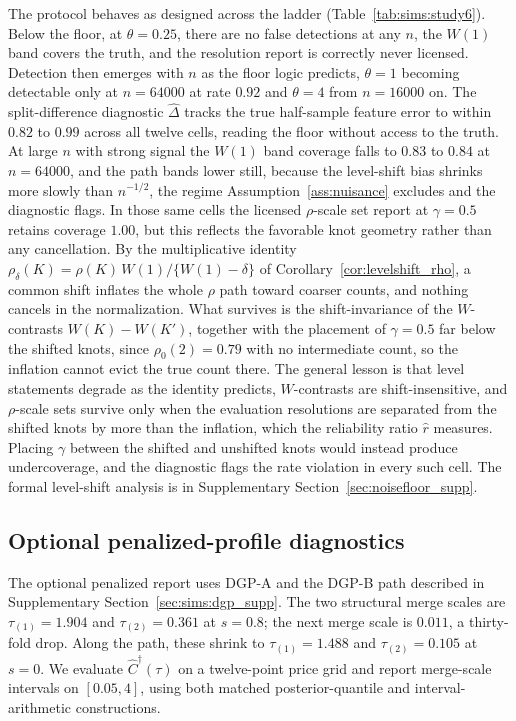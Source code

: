\documentclass[11pt]{article}
\begin{document}
The protocol behaves as designed across the ladder (Table~\ref{tab:sims:study6}). Below the floor, at $\theta=0.25$, there are no false detections at any $n$, the $W(1)$ band covers the truth, and the resolution report is correctly never licensed. Detection then emerges with $n$ as the floor logic predicts, $\theta=1$ becoming detectable only at $n=64000$ at rate $0.92$ and $\theta=4$ from $n=16000$ on. The split-difference diagnostic $\widehat\Delta$ tracks the true half-sample feature error to within $0.82$ to $0.99$ across all twelve cells, reading the floor without access to the truth. At large $n$ with strong signal the $W(1)$ band coverage falls to $0.83$ to $0.84$ at $n=64000$, and the path bands lower still, because the level-shift bias shrinks more slowly than $n^{-1/2}$, the regime Assumption~\ref{ass:nuisance} excludes and the diagnostic flags. In those same cells the licensed $\rho$-scale set report at $\gamma=0.5$ retains coverage $1.00$, but this reflects the favorable knot geometry rather than any cancellation. By the multiplicative identity $\rho_\delta(K)=\rho(K)\,W(1)/\{W(1)-\delta\}$ of Corollary~\ref{cor:levelshift_rho}, a common shift inflates the whole $\rho$ path toward coarser counts, and nothing cancels in the normalization. What survives is the shift-invariance of the $W$-contrasts $W(K)-W(K')$, together with the placement of $\gamma=0.5$ far below the shifted knots, since $\rho_0(2)=0.79$ with no intermediate count, so the inflation cannot evict the true count there. The general lesson is that level statements degrade as the identity predicts, $W$-contrasts are shift-insensitive, and $\rho$-scale sets survive only when the evaluation resolutions are separated from the shifted knots by more than the inflation, which the reliability ratio $\hat r$ measures. Placing $\gamma$ between the shifted and unshifted knots would instead produce undercoverage, and the diagnostic flags the rate violation in every such cell. The formal level-shift analysis is in Supplementary Section~\ref{sec:noisefloor_supp}.

\subsection{Optional penalized-profile diagnostics}\label{sec:sims:penalized_profile_supp}

The optional penalized report uses DGP-A and the DGP-B path described in Supplementary Section~\ref{sec:sims:dgp_supp}.  The two structural merge scales are $\tau_{(1)}=1.904$ and $\tau_{(2)}=0.361$ at $s=0.8$; the next merge scale is $0.011$, a thirty-fold drop.  Along the path, these shrink to $\tau_{(1)}=1.488$ and $\tau_{(2)}=0.105$ at $s=0$.  We evaluate $\widehat C^\dagger(\tau)$ on a twelve-point price grid and report merge-scale intervals on $[0.05,4]$, using both matched posterior-quantile and interval-arithmetic constructions.
\end{document}
